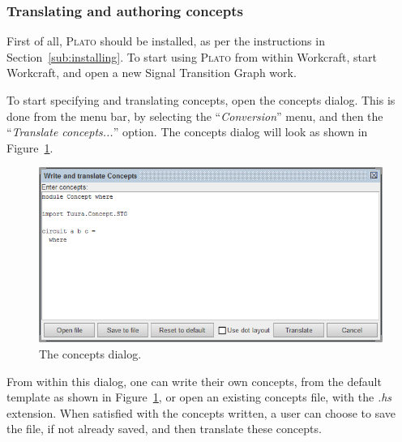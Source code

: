 \documentclass[british,conference,compsoc]{IEEEtran}
\newcommand{\noun}[1]{\textsc{#1}}
\begin{document}
\vspace{-2mm}
 
\subsubsection{Translating and authoring concepts}

First of all, \noun{Plato} should be installed, as per the instructions in
Section~\ref{sub:installing}. To start using \noun{Plato} from within Workcraft, 
start Workcraft, and open a new Signal Transition Graph work. 

To start specifying and translating concepts, open the concepts dialog.  This is
done from the menu bar, by selecting the ``\emph{Conversion}'' menu, and then
the ``\emph{Translate concepts...}'' option. The concepts dialog will look as 
shown in Figure~\ref{fig:concepts_dialog_screenshot}.


\begin{figure}[h]
\begin{centering}
\includegraphics[scale=0.45]{Images/concepts_dialog_screenshot.png}
\par\end{centering}

\begin{centering}
\protect\caption{\label{fig:concepts_dialog_screenshot}The concepts dialog.}

\par\end{centering}
\vspace{-4mm}
\end{figure}


From within this dialog, one can write their own concepts, from the default 
template as shown in Figure~\ref{fig:concepts_dialog_screenshot}, or open an 
existing concepts file, with the \emph{.hs} extension. When satisfied with the 
concepts written, a user can choose to save the file, if not already saved, and
then translate these concepts.
\end{document}

